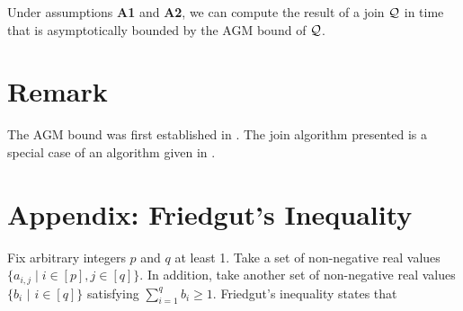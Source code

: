 \begin{corollary}
   Under assumptions {\bf A1} and {\bf A2}, we can compute the result of a join $\mathcal{Q}$ in time that is asymptotically bounded by the AGM bound of $\mathcal{Q}$.
\end{corollary}

\section{Remark}

The AGM bound was first established in \cite{agm13}. The join algorithm presented is a special case of an algorithm given in \cite{nrr13}.




\appendix

\section{Appendix: Friedgut's Inequality} \label{app:friedgut}

Fix arbitrary integers $p$ and $q$ at least 1. Take a set of non-negative real values $\{a_{i,j} \mid i \in [p], j \in [q]\}$. In addition, take another set of non-negative real values $\{b_i$ $\mid$ $i \in [q]\}$ satisfying $\sum_{i=1}^{q} b_i \geq 1$.  Friedgut's inequality \cite{f04} states that


